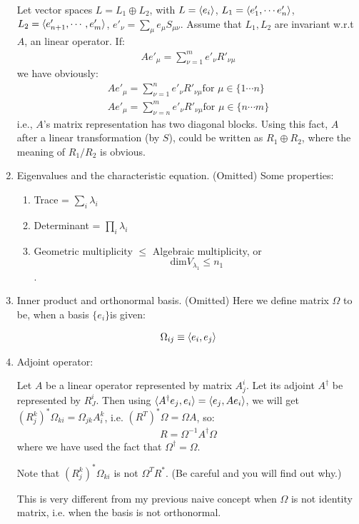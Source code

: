 \begin{enumerate}
        Let vector spaces $L=L_1\oplus L_2$, with $L=\braket{e_i}$,
        $L_1=\braket{e'_1,\cdots e'_n}$,$L_2=\braket{e'_{n+1},\cdots,e'_m}$,
        $e'_\nu=\sum_\mu e_\mu  S_{\mu\nu}$. 
        Assume that $L_1,L_2$ are invariant w.r.t $A$, an linear operator. If:
        \begin{align}
            A e'_\mu = \sum_{\nu=1}^{m} e'_\nu R'_{\nu\mu}
        \end{align}
        we have obviously:
        \begin{align}
            A e'_\mu = \sum_{\nu=1}^{n} e'_\nu R'_{\nu\mu} \text{for }
                \mu\in \{1\cdots n\}
                \\
            A e'_\mu = \sum_{\nu=n}^{m} e'_\nu R'_{\nu\mu} \text{for }
                \mu\in \{n\cdots m\}
        \end{align}
        i.e., $A$'s matrix representation has two diagonal blocks.
        Using this fact, $A$ after a linear transformation (by $S$),
        could be written as $R_1\oplus R_2$, where the meaning of $R_1/R_2$
        is obvious.
    \item Eigenvalues and the characteristic equation. (Omitted)
        Some properties:
        \begin{enumerate}
            \item Trace = $\sum_i \lambda_i$
            \item Determinant = $\prod_i \lambda_i$
            \item Geometric multiplicity $\leq$ Algebraic multiplicity, or
                $$\mathrm{dim}V_{\lambda_1} \leq n_1$$.
        \end{enumerate}
    \item Inner product and orthonormal basis. (Omitted) Here we define
        matrix $\Omega$ to be, when a basis $\{e_i\}$is given:
        \begin{defi}[]
            \begin{align}
                \Omega_{ij} \equiv \braket{e_i,e_j}
            \end{align}
        \end{defi}
    \item Adjoint operator:

        Let $A$ be a linear operator represented by matrix $A^i_j$. Let
        its adjoint $A^\dagger$ be represented by $R^i_J$. Then using
        $\braket{A^\dagger e_j, e_i} = \braket{e_j,A e_i}$, we will
        get $(R^{k}_j)^* \Omega_{ki}= \Omega_{jk}A^k_i$, i.e.
        $(R^T)^* \Omega = \Omega A$, so:
        \begin{align}
            R = \Omega^{-1} A^\dagger \Omega
        \end{align}
        where we have used the fact that $\Omega^\dagger=\Omega$.

        Note that $(R^{k}_j)^* \Omega_{ki}$ is not $\Omega^T R^*$.
        (Be careful and you will find out why.)

        This is very different from my previous naive concept
        when $\Omega$ is not identity matrix, i.e. when the basis
        is not orthonormal.
\end{enumerate}

